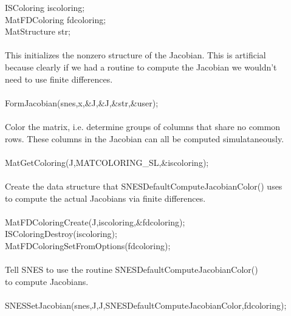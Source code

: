\begin{tabbing}
   ISColoring    iscoloring;\\
   MatFDColoring fdcoloring;\\
   MatStructure  str;\\

   \trl{/*}\\
      This initializes the nonzero structure of the Jacobian. This is artificial\\
      because clearly if we had a routine to compute the Jacobian we wouldn't\\
      need to use finite differences.\\
   \trl{*/}\\
   FormJacobian(snes,x,\&J,\&J,\&str,\&user);\\

   \trl{/*}\\
       Color the matrix, i.e. determine groups of columns that share no common \\
      rows. These columns in the Jacobian can all be computed simulataneously.\\
   \trl{*/}\\
   MatGetColoring(J,MATCOLORING\_SL,\&iscoloring);\\

   \trl{/*}\\
       Create the data structure that SNESDefaultComputeJacobianColor() uses\\
       to compute the actual Jacobians via finite differences.\\
   \trl{*/}\\
   MatFDColoringCreate(J,iscoloring,\&fdcoloring);\\
   ISColoringDestroy(iscoloring);\\
   MatFDColoringSetFromOptions(fdcoloring);\\

   \trl{/*}\\
      Tell SNES to use the routine SNESDefaultComputeJacobianColor()\\
      to compute Jacobians.\\
   \trl{*/}\\
   SNESSetJacobian(snes,J,J,SNESDefaultComputeJacobianColor,fdcoloring);\\

\end{tabbing}

  
 

